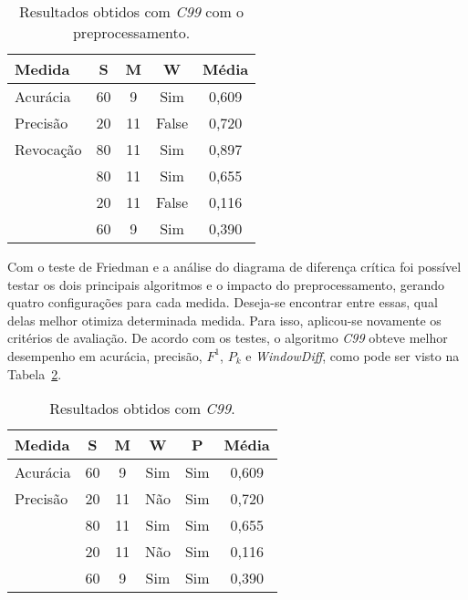 \begin{table}[!h]
	\centering

	\begin{tabular}{|l|c|c|c|c|} \hline
		\textbf{Medida} & \textbf{S} & \textbf{M} & \textbf{W} & \textbf{Média}\\	\hline

		Acurácia	& 60 &  9 & Sim 	& 0,609 \\ \hline
		Precisão	& 20 & 11 & False 	& 0,720 \\ \hline
		Revocação	& 80 & 11 & Sim 	& 0,897 \\ \hline
		\fum		& 80 & 11 & Sim 	& 0,655 \\ \hline
		\pk			& 20 & 11 & False 	& 0,116 \\ \hline
		\windiff	& 60 &  9 & Sim 	& 0,390 \\ \hline

	\end{tabular}
	
	\caption{Resultados obtidos com \textit{C99} com o preprocessamento.}
	\label{tab:c99compreprocess}
\end{table}




Com o teste de Friedman e a análise do diagrama de diferença crítica foi possível testar os dois principais algoritmos e o impacto do preprocessamento, gerando quatro configurações para cada medida.
% 
Deseja-se encontrar entre essas, qual delas melhor otimiza determinada medida. Para isso, aplicou-se novamente os critérios de avaliação. De acordo com os testes, o algoritmo \textit{C99} obteve melhor desempenho em acurácia, precisão, $F^1$, $P_k$ e \textit{WindowDiff}, como pode ser visto na Tabela~\ref{tab:configfinal}. 



\begin{table}[!h]
	\centering

	\begin{tabular}{|l|c|c|c|c|c|} \hline
		\textbf{Medida} & \textbf{S} & \textbf{M} & \textbf{W} & \textbf{P} & \textbf{Média}\\	\hline

		Acurácia	& 60 &  9 & Sim & Sim & 0,609 \\ \hline
		Precisão	& 20 & 11 & Não & Sim & 0,720 \\ \hline
		\fum		& 80 & 11 & Sim & Sim & 0,655 \\ \hline
		\pk			& 20 & 11 & Não & Sim & 0,116 \\ \hline
		\windiff	& 60 &  9 & Sim & Sim & 0,390 \\ \hline

	\end{tabular}
	
	\caption{Resultados obtidos com \textit{C99}.}
	\label{tab:configfinal}
\end{table}




